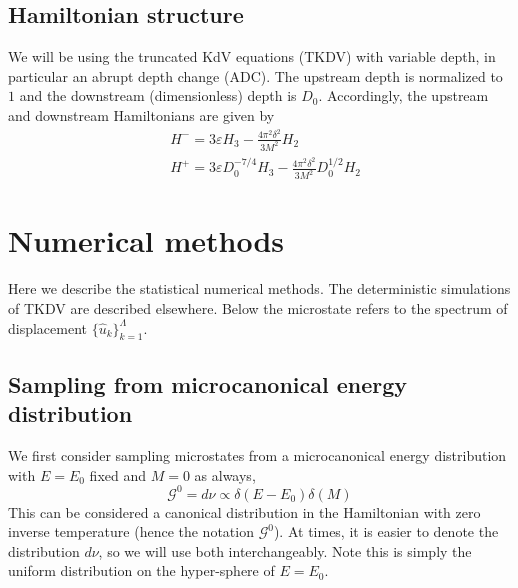\documentclass[12pt]{article}
\newcommand{\np}{\newpage \noindent}
\newcommand{\eps}{\varepsilon}
\newcommand{\uhat}{\hat{u}}
\newcommand{\Gibbs}{\mathcal{G}}
\begin{document}
\np

\subsection{Hamiltonian structure}
We will be using the truncated KdV equations (TKDV) with variable depth, in particular an abrupt depth change (ADC). The upstream depth is normalized to $1$ and the downstream (dimensionless) depth is $D_0$. Accordingly, the upstream and downstream Hamiltonians are given by
\begin{align}
\label{Hamiltonian}
& H^- = 3 \eps H_3 - \frac{4 \pi^2 \delta^2}{3 M^2} H_2 \\
& H^+ = 3 \eps D_0^{-7/4} H_3 - \frac{4 \pi^2 \delta^2}{3 M^2} D_0^{1/2} H_2
\end{align}


\section{Numerical methods}

Here we describe the statistical numerical methods. The deterministic simulations of TKDV are described elsewhere. Below the microstate refers to the spectrum of displacement $\{ \uhat_k \}_{k=1}^{\Lambda}$.

\subsection{Sampling from microcanonical energy distribution}
\label{sec_microcan}

We first consider sampling microstates from a microcanonical energy distribution with $E=E_0$ fixed and $M=0$ as always,
\begin{equation}
\Gibbs^0 = d\nu \propto \delta(E-E_0) \delta(M)
\end{equation}
This can be considered a canonical distribution in the Hamiltonian with zero inverse temperature (hence the notation $\Gibbs^0$). At times, it is easier to denote the distribution $d\nu$, so we will use both interchangeably. Note this is simply the uniform distribution on the hyper-sphere of $E=E_0$.
\end{document}
